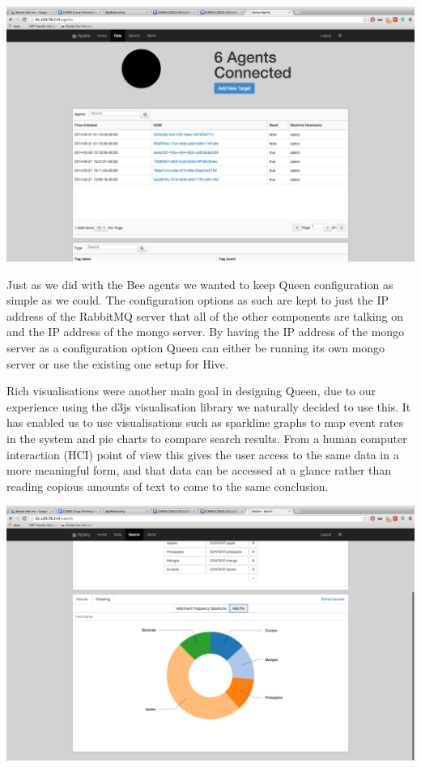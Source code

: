\graphicspath{{./pics/}}
\includegraphics[width=\textwidth, keepaspectratio]{data.png}

Just as we did with the Bee agents we wanted to keep
Queen configuration as
simple as we could. The configuration options as such
are kept to just the IP
address of the RabbitMQ server that all of the other
components are talking on and
the IP address of the mongo server. By having the IP
address of the mongo server
as a configuration option Queen can either be running
its own mongo server or
use the existing one setup for Hive.

Rich visualisations were another main goal in designing
Queen, due to our
experience using the d3js\cite{d3} visualisation library we
naturally decided to use
this. It has enabled us to use visualisations such as
sparkline graphs to map
event rates in the system and pie charts to compare search
results. From a
human computer interaction (HCI) point of view this gives
the user access to the
same data in a more meaningful form, and that data can be
accessed at a glance
rather than reading copious amounts of text to come to the
same conclusion.


\graphicspath{{./pics/}}
\includegraphics[width=\textwidth, keepaspectratio]{search.png}

